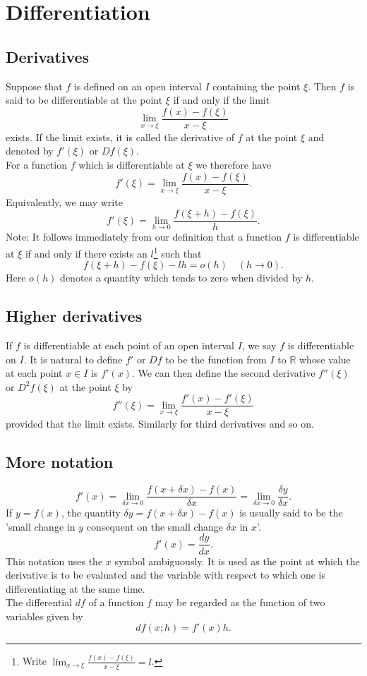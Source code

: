 \documentclass[10pt, a4paper]{article}
\newcommand{\R}{\mathbb{R}}
\begin{document}
\newpage

\section{Differentiation}

\subsection{Derivatives}
Suppose that $f$ is defined on an open interval $I$ containing the point $\xi$. Then $f$ is said to be differentiable at the point $\xi$ if and only if the limit
\[
\lim_{x \rightarrow \xi}{\dfrac{f(x) - f(\xi)}{x - \xi}}
\]
exists. If the limit exists, it is called the derivative of $f$ at the point $\xi$ and denoted by $f'(\xi)$ or $Df(\xi)$. \\
For a function $f$ which is differentiable at $\xi$ we therefore have
\[
f'(\xi) = \lim_{x \rightarrow \xi}{\dfrac{f(x) - f(\xi)}{x - \xi}}.
\]
Equivalently, we may write
\[
f'(\xi) = \lim_{h \rightarrow 0}{\dfrac{f(\xi + h) - f(\xi)}{h}}.
\]
Note: It follows immediately from our definition that a function $f$ is differentiable at $\xi$ if and only if there exists an $l$\footnote{Write $\lim_{x \rightarrow \xi}{\frac{f(x) - f(\xi)}{x - \xi}} = l$.} such that
\[f(\xi + h) - f(\xi) - lh = o(h)\quad(h \rightarrow 0).\]
Here $o(h)$ denotes a quantity which tends to zero when divided by $h$.

\subsection{Higher derivatives}
If $f$ is differentiable at each point of an open interval $I$, we say $f$ is differentiable on $I$. It is natural to define $f'$ or $Df$ to be the function from $I$ to $\R$ whose value at each point $x \in I$ is $f'(x)$. We can then define the second derivative $f''(\xi)$ or $D ^ 2 f(\xi)$ at the point $\xi$ by
\[
f''(\xi) = \lim_{x \rightarrow \xi}{\dfrac{f'(x) - f'(\xi)}{x - \xi}}
\]
provided that the limit exists. Similarly for third derivatives and so on.

\subsection{More notation}
\[
f'(x) = \lim_{\delta x \rightarrow 0}{\dfrac{f(x + \delta x) - f(x)}{\delta x}} = \lim_{\delta x \rightarrow 0}{\dfrac{\delta y}{\delta x}}.
\]
If $y = f(x)$, the quantity $\delta y = f(x + \delta x) - f(x)$ is usually said to be the 'small change in $y$ consequent on the small change $\delta x$ in $x$'.
\[
f'(x) = \dfrac{dy}{dx}.
\]
This notation uses the $x$ symbol ambiguously. It is used as the point at which the derivative is to be evaluated and the variable with respect to which one is differentiating at the same time. \\
The differential $df$ of a function $f$ may be regarded as the function of two variables given by
\[
df(x; h) = f'(x)h.
\]
\end{document}
